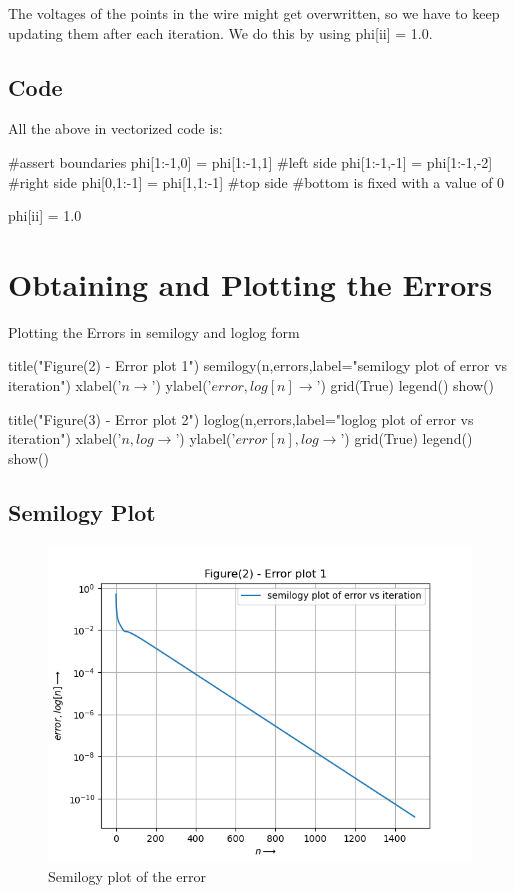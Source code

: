 \documentclass[11pt]{article}
\begin{document}
The voltages of the points in the wire might get overwritten, so we have to 
keep updating them after each iteration. We do this by using phi[ii] = 1.0.

\subsection{Code}
All the above in vectorized code is:
\begin{python}
    #assert boundaries
	phi[1:-1,0] = phi[1:-1,1]	#left side
	phi[1:-1,-1] = phi[1:-1,-2]	#right side
	phi[0,1:-1] = phi[1,1:-1]	#top side
	#bottom is fixed with a value of 0

	phi[ii] = 1.0
\end{python}

\section{Obtaining and Plotting the Errors}
Plotting the Errors in semilogy and loglog form

\begin{python}
title("Figure(2) - Error plot 1")
semilogy(n,errors,label="semilogy plot of error vs iteration")
xlabel('$n\longrightarrow$')
ylabel('$error,log[n]\longrightarrow$')
grid(True)
legend()
show()

title("Figure(3) - Error plot 2")
loglog(n,errors,label="loglog plot of error vs iteration")
xlabel('$n,log\longrightarrow$')
ylabel('$error[n],log\longrightarrow$')
grid(True)
legend()
show()
\end{python}

\subsection{Semilogy Plot}
\begin{figure}[H]
    \centering
    \includegraphics[scale = 1]{Figure_2.png}
    \caption{Semilogy plot of the error}
\end{figure}
\end{document}
